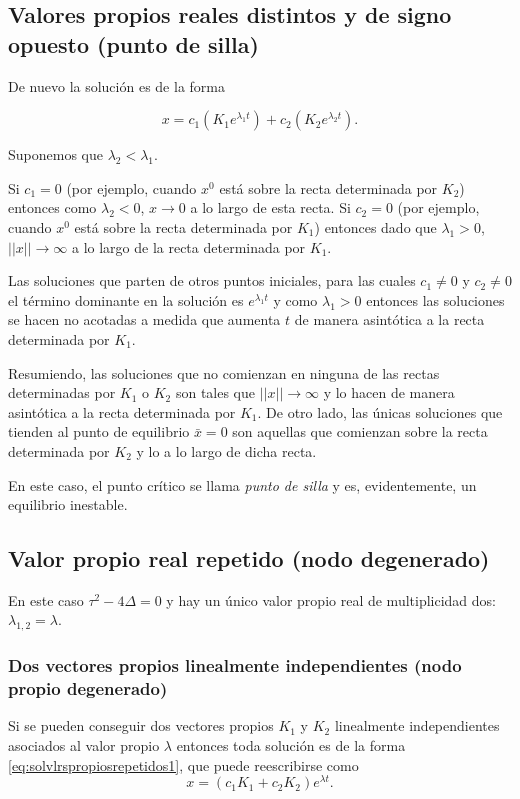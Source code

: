 \documentclass[11pt]{book}
\theoremstyle{definition}
\numberwithin{definition}{section}
\theoremstyle{theorem}
\numberwithin{theorem}{section}
\numberwithin{lemma}{section}
\numberwithin{corollary}{section}
\theoremstyle{plain}
\numberwithin{example}{section}
\begin{document}
\subsection{Valores propios reales distintos y de signo opuesto (punto de silla)}

De nuevo la solución es de la forma

$$ x = c_1(K_1 e^{\lambda_1 t}) + c_2(K_2 e^{\lambda_2 t}). $$

Suponemos que $\lambda_2 < \lambda_1$.

Si $c_1 = 0$ (por ejemplo, cuando $x^0$ está sobre la recta determinada por $K_2$) entonces como $\lambda_2 < 0$, $x \to 0$ a lo largo de esta recta.
Si $c_2 = 0$ (por ejemplo, cuando $x^0$ está sobre la recta determinada por $K_1$) entonces dado que $\lambda_1 >0$, $||x|| \to \infty$ a lo largo de la recta determinada por $K_1$.

Las soluciones que parten de otros puntos iniciales, para las cuales $c_1 \neq 0$ y $c_2 \neq 0$ el término dominante en la solución es $e^{\lambda_1 t}$ y como $\lambda_1 > 0$ entonces las soluciones se hacen no acotadas a medida que aumenta $t$ de manera asintótica a la recta determinada por $K_1$.

Resumiendo, las soluciones que no comienzan en ninguna de las rectas determinadas por $K_1$ o $K_2$ son tales que $||x|| \to \infty$ y lo hacen de manera asintótica a la recta determinada por $K_1$. De otro lado, las únicas soluciones que tienden al punto de equilibrio $\bar{x} = 0$ son aquellas que comienzan sobre la recta determinada por $K_2$ y lo a lo largo de dicha recta.

En este caso, el punto crítico se llama \emph{punto de silla} y es, evidentemente, un equilibrio inestable.

\subsection{Valor propio real repetido (nodo degenerado)}

En este caso $\tau^2 - 4\Delta = 0$ y hay un único valor propio real de multiplicidad dos: $\lambda_{1,2} = \lambda$.

\subsubsection{Dos vectores propios linealmente independientes (nodo propio degenerado)}

Si se pueden conseguir dos vectores propios $K_1$ y $K_2$ linealmente independientes asociados al valor propio $\lambda$ entonces toda solución es de la forma \ref{eq:solvlrspropiosrepetidos1}, que puede reescribirse como
$$ x = (c_1K_1 + c_2K_2)e^{\lambda t}.$$
\end{document}
